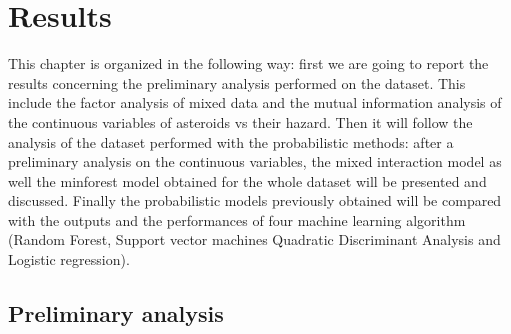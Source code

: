 \documentclass[12pt,%
               a4paper,%
               oneside,openany,%
               titlepage,%
               headinclude,footinclude,%
               BCOR5mm,%
               cleardoublepage=empty,%
               tablecaptionabove,%
               floatperchapter,
               ]{scrreprt}                 %
\begin{document}
\chapter{Results}

This chapter is organized in the following way: first we are going to report the results concerning the preliminary analysis performed on the dataset. This include the factor analysis of mixed data and the mutual information analysis of the continuous variables of asteroids vs their hazard. Then it will follow the analysis of the dataset performed with the probabilistic methods: after a preliminary analysis on the continuous variables, the mixed interaction model as well the minforest model obtained for the whole dataset will be presented and discussed. Finally the probabilistic models previously obtained will be compared with the outputs and the performances of four machine learning algorithm (Random Forest, Support vector machines Quadratic Discriminant Analysis and Logistic regression).

\section{Preliminary analysis}
\end{document}
